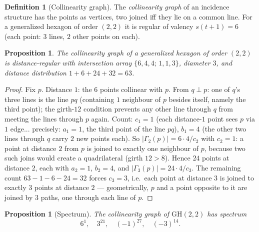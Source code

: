 \documentclass[11pt]{article}
\newtheorem{proposition}[theorem]{Proposition}
\theoremstyle{definition}
\newtheorem{definition}[theorem]{Definition}
\newcommand{\GH}{\mathrm{GH}}
\begin{document}
\begin{definition}[Collinearity graph]
The \emph{collinearity graph} of an incidence structure has the points as
vertices, two joined iff they lie on a common line. For a generalized hexagon
of order $(2,2)$ it is regular of valency $s(t+1) = 6$ (each point: $3$
lines, $2$ other points on each).
\end{definition}

\begin{proposition}\label{prop:drg}
The collinearity graph of a generalized hexagon of order $(2,2)$ is
distance-regular with intersection array $\{6,4,4;\,1,1,3\}$, diameter $3$,
and distance distribution $1 + 6 + 24 + 32 = 63$.
\end{proposition}

\begin{proof}
Fix $p$. Distance $1$: the $6$ points collinear with $p$. From
$q \perp p$: one of $q$'s three lines is the line $pq$ (containing $1$
neighbour of $p$ besides itself, namely the third point); the girth-$12$
condition prevents any other line through $q$ from meeting the lines through
$p$ again. Count: $c_1 = 1$ (each distance-$1$ point sees $p$ via $1$ edge...
precisely: $a_1 = 1$, the third point of the line $pq$), $b_1 = 4$ (the other
two lines through $q$ carry $2$ new points each). So
$|{\Gamma_2(p)}| = 6\cdot 4/c_2$ with $c_2 = 1$: a point at distance $2$ from
$p$ is joined to exactly one neighbour of $p$, because two such joins would
create a quadrilateral (girth $12 > 8$). Hence $24$ points at distance $2$,
each with $a_2 = 1$, $b_2 = 4$, and $|\Gamma_3(p)| = 24\cdot 4 / c_3$. The
remaining count $63 - 1 - 6 - 24 = 32$ forces $c_3 = 3$, i.e.\ each point at
distance $3$ is joined to exactly $3$ points at distance $2$ ---
geometrically, $p$ and a point opposite to it are joined by $3$ paths, one
through each line of $p$.
\end{proof}

\begin{proposition}[Spectrum]\label{prop:spectrum}
The collinearity graph of $\GH(2,2)$ has spectrum
\[
6^1,\quad 3^{21},\quad (-1)^{27},\quad (-3)^{14}.
\]
\end{proposition}
\end{document}
